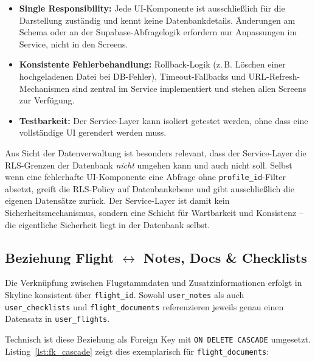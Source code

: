 \begin{itemize}
  \item \textbf{Single Responsibility:} Jede UI-Komponente ist ausschließlich
        für die Darstellung zuständig und kennt keine Datenbankdetails.
        Änderungen am Schema oder an der Supabase-Abfragelogik erfordern nur
        Anpassungen im Service, nicht in den Screens.
  \item \textbf{Konsistente Fehlerbehandlung:} Rollback-Logik (z.\,B. Löschen
        einer hochgeladenen Datei bei DB-Fehler), Timeout-Fallbacks und
        URL-Refresh-Mechanismen sind zentral im Service implementiert und
        stehen allen Screens zur Verfügung.
  \item \textbf{Testbarkeit:} Der Service-Layer kann isoliert getestet werden,
        ohne dass eine vollständige UI gerendert werden muss.
\end{itemize}

Aus Sicht der Datenverwaltung ist besonders relevant, dass der Service-Layer
die RLS-Grenzen der Datenbank \emph{nicht} umgehen kann und auch nicht soll.
Selbst wenn eine fehlerhafte UI-Komponente eine Abfrage ohne
\texttt{profile\_id}-Filter absetzt, greift die RLS-Policy auf Datenbankebene
und gibt ausschließlich die eigenen Datensätze zurück.
Der Service-Layer ist damit kein Sicherheitsmechanismus, sondern eine
Schicht für Wartbarkeit und Konsistenz -- die eigentliche Sicherheit liegt
in der Datenbank selbst.

\subsection{Beziehung Flight \texorpdfstring{$\leftrightarrow$}{<->}
            Notes, Docs \& Checklists}

Die Verknüpfung zwischen Flugstammdaten und Zusatzinformationen erfolgt in Skyline konsistent
über \texttt{flight\_id}.
Sowohl \texttt{user\_notes} als auch \texttt{user\_checklists} und \texttt{flight\_documents}
referenzieren jeweils genau einen Datensatz in \texttt{user\_flights}.

Technisch ist diese Beziehung als Foreign Key mit \texttt{ON DELETE CASCADE} umgesetzt.
Listing~\ref{lst:fk_cascade} zeigt dies exemplarisch für \texttt{flight\_documents}:

